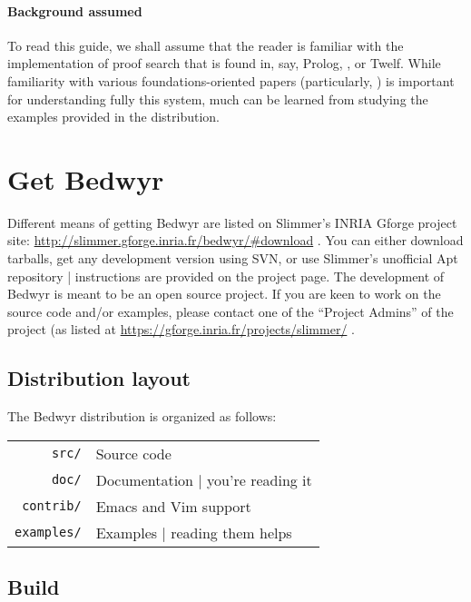 \paragraph{Background assumed}
To read this guide, we shall assume that the reader is familiar with
the implementation of proof search that is found in, say, Prolog,
\lp{}, or Twelf.  While familiarity with various foundations-oriented
papers (particularly,
\cite{mcdowell03tcs,miller05tocl,tiu04phd,baelde08lfmtp,tiu10tocl}) is
important for understanding fully this system, much can be learned
from studying the examples provided in the distribution.


\section{Get Bedwyr}

Different means of getting Bedwyr are listed on Slimmer's INRIA Gforge
project site:
\urldef{\thisurl}\url{http://slimmer.gforge.inria.fr/bedwyr/#download}
\ahrefurl{\thisurl}.
You can either download tarballs, get any development version using SVN,
or use Slimmer's unofficial Apt repository | instructions are provided
on the project page.
The development of Bedwyr is meant to be an open source project.
If you are keen to work on the source code and/or examples, please contact
one of the ``Project Admins'' of the project (as listed at
\urldef{\thisurl}\url{https://gforge.inria.fr/projects/slimmer/}
\ahrefurl{\thisurl}.

\subsection{Distribution layout}

The Bedwyr distribution is organized as follows:

\begin{tabular}{r@{\quad}l}
  \texttt{src/}      & Source code \\
  \texttt{doc/}      & Documentation | you're reading it \\
  \texttt{contrib/}  & Emacs and Vim support \\
  \texttt{examples/} & Examples | reading them helps
\end{tabular}

\subsection{Build}

